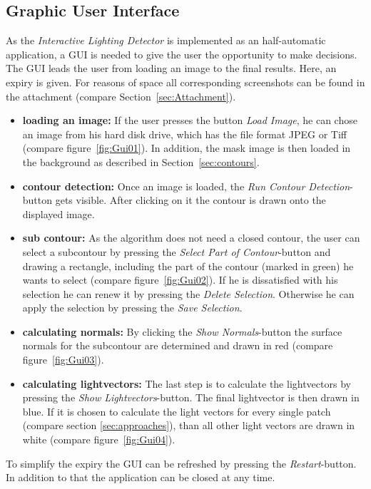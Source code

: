 \subsection{Graphic User Interface} \label{sec:GUI}

As the \textit{Interactive Lighting Detector} is implemented as an half-automatic application, a GUI is needed to give the user the opportunity to make decisions. The GUI leads the user from loading an image to the final results. Here, an expiry is given. For reasons of space all corresponding screenshots can be found in the attachment (compare Section~\ref{sec:Attachment}).  
\begin{itemize}
\item \textbf{loading an image:} If the user presses the button \textit{Load Image}, he can chose an image from his hard disk drive, which has the file format JPEG or Tiff (compare figure~\ref{fig:Gui01}). In addition, the mask image is then loaded in the background as described in Section~\ref{sec:contours}.
\item \textbf{contour detection:} Once an image is loaded, the \textit{Run Contour Detection}-button gets visible. After clicking on it the contour is drawn onto the displayed image.
\item \textbf{sub contour:} As the algorithm does not need a closed contour, the user can select a subcontour by pressing the \textit{Select Part of Contour}-button and drawing a rectangle, including the part of the contour (marked in green) he wants to select (compare figure~\ref{fig:Gui02}). If he is dissatisfied with his selection he can renew it by pressing the \textit{Delete Selection}. Otherwise he can apply the selection by pressing the \textit{Save Selection}. 
\item \textbf{calculating normals:} By clicking the \textit{Show Normals}-button the surface normals for the subcontour are determined and drawn in red (compare figure~\ref{fig:Gui03}).
\item \textbf{calculating lightvectors:} The last step is to calculate the lightvectors by pressing the \textit{Show Lightvectors}-button. The final lightvector is then drawn in blue. If it is chosen to calculate the light vectors for every single patch (compare section \ref{sec:approaches}), than all other light vectors are drawn in white (compare figure~\ref{fig:Gui04}). 
\end{itemize}

To simplify the expiry the GUI can be refreshed by pressing the \textit{Restart}-button. In addition to that the application can be closed at any time. 


\newpage